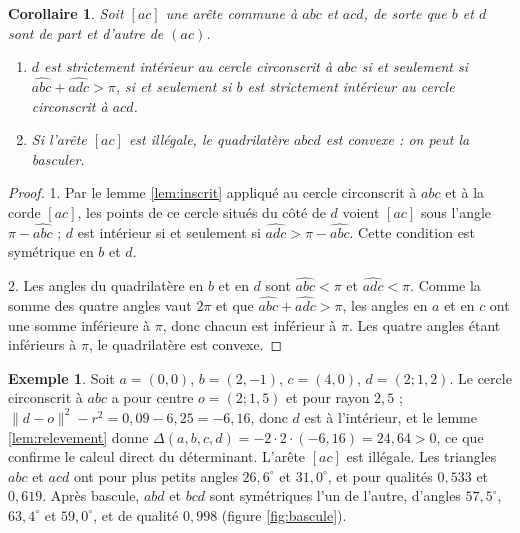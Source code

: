 \documentclass[11pt,a4paper]{article}
\theoremstyle{plain}
\newtheorem{corollaire}[theoreme]{Corollaire}
\theoremstyle{definition}
\newtheorem{exemple}[theoreme]{Exemple}
\theoremstyle{remark}
\begin{document}
\begin{corollaire}\label{cor:quadrilatere}
Soit $[ac]$ une arête commune à $abc$ et $acd$, de sorte que $b$ et $d$ sont de part et d'autre de $(ac)$.
\begin{enumerate}[nosep]
\item $d$ est strictement intérieur au cercle circonscrit à $abc$ si et seulement si $\widehat{abc}+\widehat{adc}>\pi$, si et seulement si $b$ est strictement intérieur au cercle circonscrit à $acd$.
\item Si l'arête $[ac]$ est illégale, le quadrilatère $abcd$ est convexe : on peut la basculer.
\end{enumerate}
\end{corollaire}

\begin{proof}
1. Par le lemme \ref{lem:inscrit} appliqué au cercle circonscrit à $abc$ et à la corde $[ac]$, les points de ce cercle situés du côté de $d$ voient $[ac]$ sous l'angle $\pi-\widehat{abc}$ ; $d$ est intérieur si et seulement si $\widehat{adc}>\pi-\widehat{abc}$. Cette condition est symétrique en $b$ et $d$.

2. Les angles du quadrilatère en $b$ et en $d$ sont $\widehat{abc}<\pi$ et $\widehat{adc}<\pi$. Comme la somme des quatre angles vaut $2\pi$ et que $\widehat{abc}+\widehat{adc}>\pi$, les angles en $a$ et en $c$ ont une somme inférieure à $\pi$, donc chacun est inférieur à $\pi$. Les quatre angles étant inférieurs à $\pi$, le quadrilatère est convexe.
\end{proof}

\begin{exemple}\label{ex:bascule}
Soit $a=(0,0)$, $b=(2,-1)$, $c=(4,0)$, $d=(2;1{,}2)$. Le cercle circonscrit à $abc$ a pour centre $o=(2;1{,}5)$ et pour rayon $2{,}5$ ; $\|d-o\|^2-r^2=0{,}09-6{,}25=-6{,}16$, donc $d$ est à l'intérieur, et le lemme \ref{lem:relevement} donne $\Delta(a,b,c,d)=-2\cdot2\cdot(-6{,}16)=24{,}64>0$, ce que confirme le calcul direct du déterminant. L'arête $[ac]$ est illégale. Les triangles $abc$ et $acd$ ont pour plus petits angles $26{,}6^\circ$ et $31{,}0^\circ$, et pour qualités $0{,}533$ et $0{,}619$. Après bascule, $abd$ et $bcd$ sont symétriques l'un de l'autre, d'angles $57{,}5^\circ$, $63{,}4^\circ$ et $59{,}0^\circ$, et de qualité $0{,}998$ (figure \ref{fig:bascule}).
\end{exemple}
\end{document}
